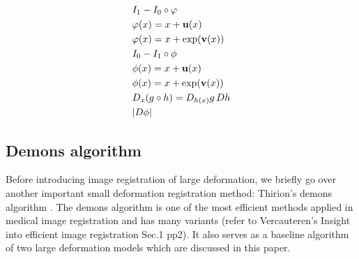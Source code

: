 \documentclass[letterpaper,12pt]{article}
\begin{document}
\begin{align}
& I_1 - I_0 \circ \varphi \\
& \varphi(x) = x + \mathbf{u}(x) \\
& \varphi(x) = x + \exp(\mathbf{v}(x)) \\
& I_0 - I_1 \circ \phi \\
& \phi(x) = x + \mathbf{u}(x) \\
& \phi(x) = x + \exp(\mathbf{v}(x)) \\
& D_{x} (g \circ h)  = D_{h(x)} g  \, D h \\ 
& |D \phi |   \\
\end{align}


\subsection{Demons algorithm}
\label{sec:demons}

Before introducing image registration of large deformation, we briefly
go over another important small deformation registration method:
Thirion's demons algorithm \cite{Thirion98}.  The demons algorithm is
one of the most efficient methods applied in medical image
registration and has many variants (refer to Vercauteren's Insight into efficient image registration Sec.1 pp2). It also serves as a baseline algorithm of two large deformation models which are discussed in this paper. 
\end{document}
